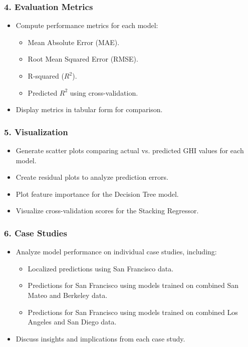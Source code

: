 \documentclass[10pt,twocolumn]{article}
\begin{document}
\begin{itemize}
\subsubsection*{4. Evaluation Metrics}
\begin{itemize}
    \item Compute performance metrics for each model:
    \begin{itemize}
        \item Mean Absolute Error (MAE).
        \item Root Mean Squared Error (RMSE).
        \item R-squared (\( R^2 \)).
        \item Predicted \( R^2 \) using cross-validation.
    \end{itemize}
    \item Display metrics in tabular form for comparison.
\end{itemize}

\subsubsection*{5. Visualization}
\begin{itemize}
    \item Generate scatter plots comparing actual vs. predicted GHI values for each model.
    \item Create residual plots to analyze prediction errors.
    \item Plot feature importance for the Decision Tree model.
    \item Visualize cross-validation scores for the Stacking Regressor.
\end{itemize}

\subsubsection*{6. Case Studies}
\begin{itemize}
    \item Analyze model performance on individual case studies, including:
    \begin{itemize}
        \item Localized predictions using San Francisco data.
        \item Predictions for San Francisco using models trained on combined San Mateo and Berkeley data.
        \item Predictions for San Francisco using models trained on combined Los Angeles and San Diego data.
    \end{itemize}
    \item Discuss insights and implications from each case study.
\end{itemize}


\end{itemize}
\end{document}
